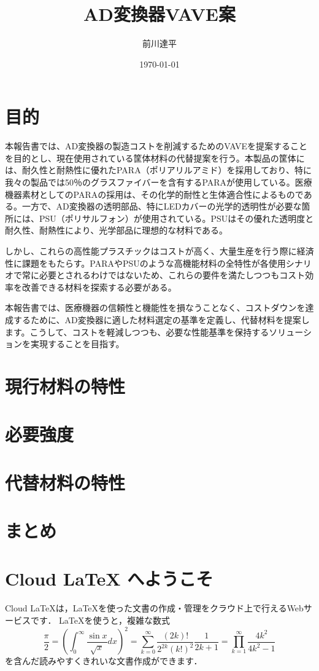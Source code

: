 \documentclass[platex,dvipdfmx]{jsarticle}			%
\title{AD変換器VAVE案}
\author{前川達平}
\date{\today}
\begin{document}
\maketitle

\section{目的}
本報告書では、AD変換器の製造コストを削減するためのVAVEを提案することを目的とし、現在使用されている筐体材料の代替提案を行う。本製品の筐体には、耐久性と耐熱性に優れたPARA（ポリアリルアミド）を採用しており、特に我々の製品では50％のグラスファイバーを含有するPARAが使用している。医療機器素材としてのPARAの採用は、その化学的耐性と生体適合性によるものである。一方で、AD変換器の透明部品、特にLEDカバーの光学的透明性が必要な箇所には、PSU（ポリサルフォン）が使用されている。PSUはその優れた透明度と耐久性、耐熱性により、光学部品に理想的な材料である。

しかし、これらの高性能プラスチックはコストが高く、大量生産を行う際に経済性に課題をもたらす。PARAやPSUのような高機能材料の全特性が各使用シナリオで常に必要とされるわけではないため、これらの要件を満たしつつもコスト効率を改善できる材料を探索する必要がある。

本報告書では、医療機器の信頼性と機能性を損なうことなく、コストダウンを達成するために、AD変換器に適した材料選定の基準を定義し、代替材料を提案します。こうして、コストを軽減しつつも、必要な性能基準を保持するソリューションを実現することを目指す。
\section{現行材料の特性}

\section{必要強度}
\section{代替材料の特性}
\section{まとめ}
\section{Cloud LaTeX へようこそ}

Cloud LaTeXは，\LaTeX を使った文書の作成・管理をクラウド上で行えるWebサービスです．
\LaTeX を使うと，複雑な数式
\begin{equation}
\frac{\pi}{2} =
\left( \int_{0}^{\infty} \frac{\sin x}{\sqrt{x}} dx \right)^2 =
\sum_{k=0}^{\infty} \frac{(2k)!}{2^{2k}(k!)^2} \frac{1}{2k+1} =
\prod_{k=1}^{\infty} \frac{4k^2}{4k^2 - 1}
\end{equation}
を含んだ読みやすくきれいな文書作成ができます．
\end{document}
